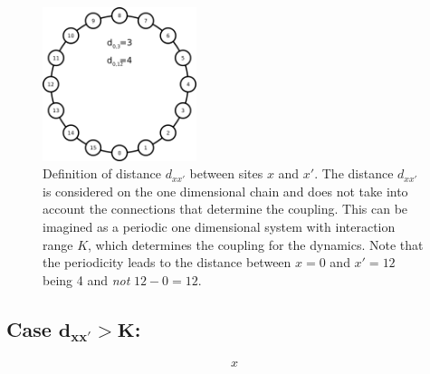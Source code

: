 \begin{figure}
    \centering
    \includegraphics[width=0.40\textwidth]{fig/ring-distance.png}
    \caption{\label{fig:ring-distance}
        Definition of distance $d_{xx'}$ between sites $x$ and $x'$. The distance $d_{xx'}$ is considered on the one dimensional chain
        and does not take into account the connections that determine the coupling. This can be imagined as a periodic one dimensional
        system with interaction range $K$, which determines the coupling for the dynamics. Note that the periodicity leads to the
        distance between $x=0$ and $x'=12$ being 4 and \textit{not} $12-0=12$.
    }
\end{figure}

\subsection{Case $\mathbf{d_{xx'}>K}$:}



\begin{align}
    x
\end{align}
